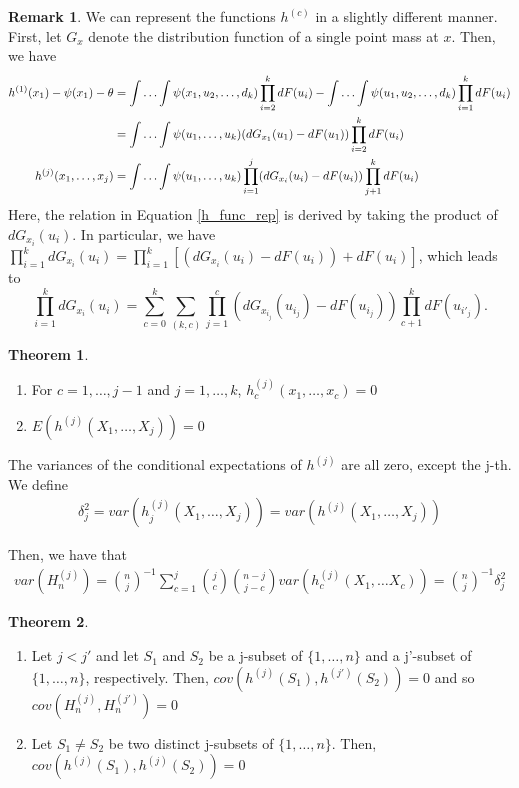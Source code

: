 \documentclass{article}
\theoremstyle{definition}
\newtheorem{theorem}{Theorem}
\numberwithin{Def}{section}
\newtheorem{Rmk}{Remark}
\begin{document}
\begin{Rmk}
We can represent the functions $h^{(c)}$ in a slightly different manner. First, let $G_x$ denote the distribution function of a single point mass at $x$. Then, we have 
\begin{align}
    h^{(1)}(x_1) - \psi(x_1) - \theta  &= \int \dotsc \int \psi(x_1, u_2, \dotsc, d_k)\prod_{i=2}^k dF(u_i) - \int \dotsc \int \psi(u_1, u_2, \dotsc, d_k)\prod_{i=1}^k dF(u_i) \notag \\
    &= \int \dotsc \int \psi(u_1, \dotsc, u_k)(dG_{x_1}(u_1) - dF(u_1))\prod_{i=2}^k dF(u_i) \notag \\
    h^{(j)}(x_1, \dotsc, x_j) &= \int \dotsc \int \psi(u_1, \dotsc, u_k) \prod_{i=1}^j(dG_{x_i}(u_i) - dF(u_i))\prod_{j+1}^kdF(u_i) \label{h_func_rep}
\end{align}
Here, the relation in Equation \ref{h_func_rep} is derived by taking the product of $dG_{x_i}(u_i)$. In particular, we have $\prod_{i=1}^kdG_{x_i}(u_i) = \prod_{i=1}^k\left[(dG_{x_i}(u_i) - dF(u_i)) + dF(u_i) \right]$, which leads to $$\prod_{i=1}^kdG_{x_i}(u_i) = \sum_{c=0}^k \sum_{(k,c)}\prod_{j=1}^c\left(dG_{x_{i_j}}(u_{i_j}) - dF(u_{i_j})\right)\prod_{c+1}^k dF(u_{i'_j}).$$
\end{Rmk}

\begin{theorem}
    \begin{enumerate} [label = (\roman*)]
        \item For $c = 1, \dotsc, j-1$ and $j = 1, \dotsc, k$, $h_c^{(j)}(x_1, \dotsc, x_c) = 0$
        \item $E(h^{(j)}(X_1, \dotsc, X_j)) = 0$
    \end{enumerate}
    \end{theorem}
    
    \item The variances of the conditional expectations of $h^{(j)}$ are all zero, except the j-th. We define 
    \begin{align}
        \delta_j^2 = var(h_j^{(j)}(X_1, \dotsc, X_j)) = var(h^{(j)}(X_1, \dotsc, X_j))
    \end{align}
    
    Then, we have that 
    \begin{align}
        var(H_n^{(j)}) = {n \choose j}^{-1}\sum_{c=1}^j {j \choose c}{n-j \choose j-c}var(h_c^{(j)}(X_1, \dotsc X_c)) = {n \choose j}^{-1}\delta_j^2
    \end{align}
    
    \begin{theorem}
    \begin{enumerate} [label = (\roman*)]
        \item Let $j <j'$ and let $S_1$ and $S_2$ be a j-subset of $\{1, \dotsc, n\}$ and a j'-subset of $\{1, \dotsc, n\}$, respectively. Then, $cov(h^{(j)}(S_1), h^{(j')}(S_2)) = 0$ and so $cov(H_n^{(j)}, H_n^{(j')}) = 0$
        \item Let $S_1 \neq S_2$ be two distinct j-subsets of $\{1, \dotsc, n\}$. Then, $cov(h^{(j)}(S_1), h^{(j)}(S_2)) = 0$
    \end{enumerate}
    \end{theorem}
    
\end{document}
